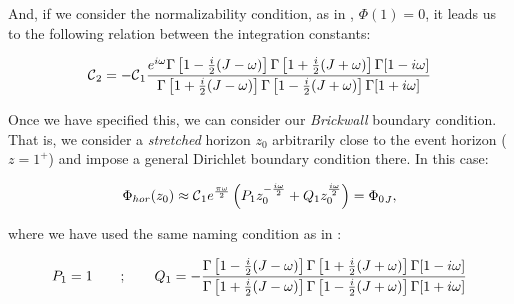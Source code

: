 \documentclass[11pt,a4paper]{article}
\begin{document}
{\noindent And, if we consider the normalizability condition, as in \cite{Jeong_2025,Das_2023,das2023fuzzballsrandommatrices}, $\Phi(1)=0$, it leads us to the following relation between the integration constants:}

\begin{equation}
    \mbox{${\cal C}$}_2 = -\mbox{${\cal C}$}_1\frac{e^{i\omega}\Gamma\left[1-\frac{i}{2}(J-\omega)\right]\Gamma\left[1+\frac{i}{2}(J+\omega)\right]\Gamma[1-i\omega]}{\Gamma\left[1+\frac{i}{2}(J-\omega)\right]\Gamma\left[1-\frac{i}{2}(J+\omega)\right]\Gamma[1+i\omega]}
\end{equation}

Once we have specified this, we can consider our \textit{Brickwall} boundary condition. That is, we consider a \textit{stretched} horizon $z_0$ arbitrarily close to the event horizon ($z=1^+$) and impose a general Dirichlet boundary condition there. In this case:

\begin{equation}\LA{BOUNDARY_BTZ}
    \Phi_{hor}(z_0)\approx \calc_1 e^{\frac{\pi\w}{2}}\left(P_1 z_0^{-\frac{i\w}{2}}+Q_1 z_0^{\frac{i\w}{2}}\right) = {\Phi_0}_J,
\end{equation}

{\noindent where we have used the same naming condition as in \cite{Jeong_2025}:}

\begin{equation}
    P_1 = 1 ~~~~~~ ; ~~~~~~ Q_1 = - \frac{\Gamma\left[1-\frac{i}{2}(J-\omega)\right]\Gamma\left[1+\frac{i}{2}(J+\omega)\right]\Gamma[1-i\omega]}{\Gamma\left[1+\frac{i}{2}(J-\omega)\right]\Gamma\left[1-\frac{i}{2}(J+\omega)\right]\Gamma[1+i\omega]}
\end{equation}
\end{document}
